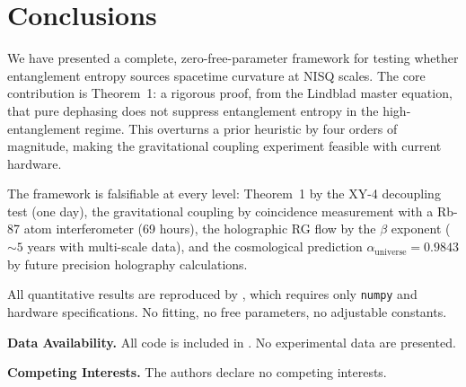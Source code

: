\documentclass[12pt,a4paper]{article}
\theoremstyle{monette}
\theoremstyle{definition}
\newcommand{\alphaU}{\alpha_{\mathrm{universe}}}
\begin{document}
\section{Conclusions}
\label{sec:conclusions}

We have presented a complete, zero-free-parameter framework for testing
whether entanglement entropy sources spacetime curvature at NISQ scales.
The core contribution is Theorem~1: a rigorous proof, from the Lindblad
master equation, that pure dephasing does not suppress entanglement entropy
in the high-entanglement regime. This overturns a prior heuristic by four
orders of magnitude, making the gravitational coupling experiment feasible
with current hardware.

The framework is falsifiable at every level: Theorem~1 by the XY-4
decoupling test (one day), the gravitational coupling by coincidence
measurement with a Rb-87 atom interferometer (69 hours), the holographic
RG flow by the $\beta$ exponent ($\sim 5$ years with multi-scale data),
and the cosmological prediction $\alphaU = 0.9843$ by future
precision holography calculations.

All quantitative results are reproduced by ,
which requires only \texttt{numpy} and hardware specifications.
No fitting, no free parameters, no adjustable constants.

\vspace{12pt}
\noindent\textbf{Data Availability.}
All code is included in . No experimental data are presented.

\noindent\textbf{Competing Interests.}
The authors declare no competing interests.
\end{document}
